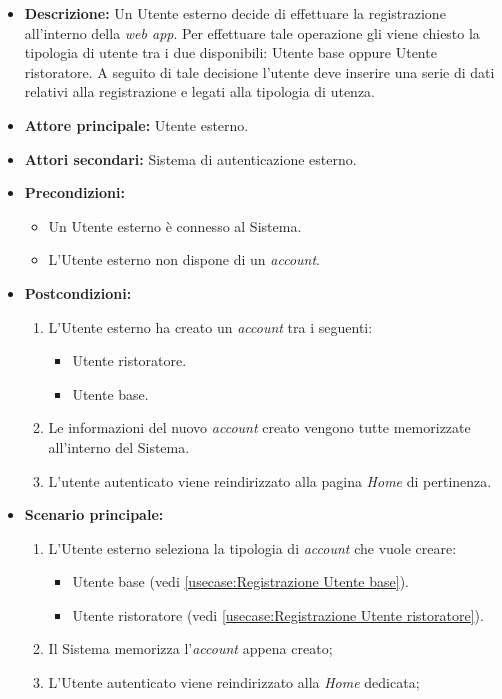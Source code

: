 \label{usecase:Effettua registrazione}

\begin{itemize}
	\item \textbf{Descrizione:} Un Utente esterno decide di effettuare la registrazione all'interno della \textit{web app}. Per effettuare tale
	operazione gli viene chiesto la tipologia di utente tra i due disponibili: Utente base oppure Utente ristoratore. 
    A seguito di tale decisione l'utente deve inserire una serie di dati relativi alla registrazione e legati alla tipologia di utenza.

	\item \textbf{Attore principale:} Utente esterno.
	\item \textbf{Attori secondari:} Sistema di autenticazione esterno.
	\item \textbf{Precondizioni:}
        \begin{itemize}
            \item Un Utente esterno è connesso al Sistema.
            \item L'Utente esterno non dispone di un \textit{account}.
        \end{itemize}
	\item \textbf{Postcondizioni:}
	    \begin{enumerate}
            \item L'Utente esterno ha creato un \textit{account} tra i seguenti:
            \begin{itemize}
                \item Utente ristoratore.
                \item Utente base.
            \end{itemize}
            \item Le informazioni del nuovo \textit{account} creato vengono tutte memorizzate all'interno del Sistema.
            \item L'utente autenticato viene reindirizzato alla pagina \textit{Home} di pertinenza.
        \end{enumerate}


	\item \textbf{Scenario principale:}
	      \begin{enumerate}
		      \item L'Utente esterno seleziona la tipologia di \textit{account} che vuole creare: 
		      \begin{itemize}
				\item Utente base (vedi \autoref{usecase:Registrazione Utente base}).
				\item Utente ristoratore (vedi \autoref{usecase:Registrazione Utente ristoratore}).
			  \end{itemize} 
              \item Il Sistema memorizza l'\textit{account} appena creato;
		      \item L'Utente autenticato viene reindirizzato alla \textit{Home} dedicata;	
	      \end{enumerate}
		

\end{itemize}

